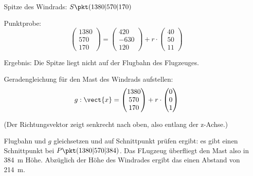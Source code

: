 \documentclass[11pt, a5paper, landscape]{scrartcl}
\begin{document}
	\begin{loesung}
		\begin{enumeratea}
			\item Spitze des Windrads: $S\pkt(1380|570|170)$
			
			Punktprobe:
			\[ \begin{pmatrix} 1380 \\ 570 \\ 170 \end{pmatrix} = \begin{pmatrix} 420 \\ -630 \\ 120 \end{pmatrix} + r\cdot \begin{pmatrix} 40 \\ 50 \\ 11 \end{pmatrix} \]
			
			Ergebnis: Die Spitze liegt nicht auf der Flugbahn des Flugzeuges.
			
			\item Geradengleichung für den Mast des Windrads aufstellen:
			\[ g: \vect{x} = \begin{pmatrix} 1380 \\ 570 \\ 170 \end{pmatrix} + r\cdot \begin{pmatrix} 0 \\ 0 \\ 1 \end{pmatrix}\]
			
			(Der Richtungsvektor zeigt senkrecht nach oben, also entlang der z-Achse.)
			
			Flugbahn und $g$ gleichsetzen und auf Schnittpunkt prüfen ergibt: es gibt einen Schnittpunkt bei $P\pkt(1380|570|384)$. Das FLugzeug überfliegt den Mast also in \SI{384}{\meter} Höhe. Abzüglich der Höhe des Windrades ergibt das einen Abstand von \SI{214}{\meter}.
		\end{enumeratea}
		\clearpage
	\end{loesung}
	
\end{document}
